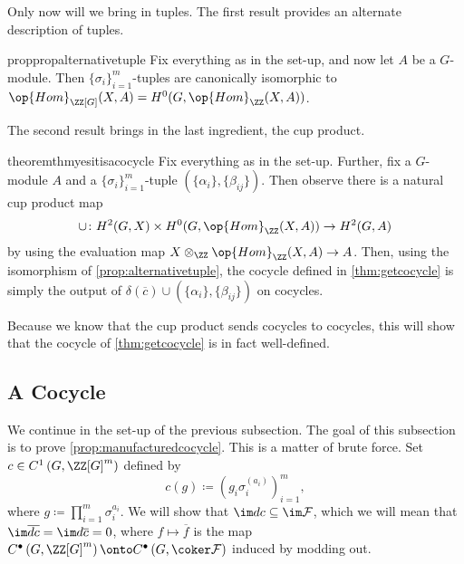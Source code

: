 \documentclass{article}
\numberwithin{equation}{section}
\begin{document}
Only now will we bring in tuples. The first result provides an alternate description of tuples.
\begin{restatable}{prop}{propalternativetuple} \label{prop:alternativetuple}
	Fix everything as in the set-up, and now let $A$ be a $G$-module. Then $\{\sigma_i\}_{i=1}^m$-tuples are canonically isomorphic to $\op{Hom}_{\ZZ[G]}(X,A)=H^0(G,\op{Hom}_\ZZ(X,A))$.
\end{restatable}
\noindent The second result brings in the last ingredient, the cup product.
\begin{restatable}{theorem}{thmyesitisacocycle} \label{thm:yesitisacocycle}
	Fix everything as in the set-up. Further, fix a $G$-module $A$ and a $\{\sigma_i\}_{i=1}^m$-tuple $\left(\{\alpha_i\},\{\beta_{ij}\}\right)$. Then observe there is a natural cup product map
	\[\cup\colon H^2(G,X)\times H^0(G,\op{Hom}_\ZZ(X,A))\to H^2(G,A)\]
	by using the evaluation map $X\otimes_\ZZ\op{Hom}_\ZZ(X,A)\to A$. Then, using the isomorphism of \autoref{prop:alternativetuple}, the cocycle defined in \autoref{thm:getcocycle} is simply the output of $\delta(\overline c)\cup\left(\{\alpha_i\},\{\beta_{ij}\}\right)$ on cocycles.
\end{restatable}
\noindent Because we know that the cup product sends cocycles to cocycles, this will show that the cocycle of \autoref{thm:getcocycle} is in fact well-defined.


\subsection{A Cocycle}
We continue in the set-up of the previous subsection. The goal of this subsection is to prove \autoref{prop:manufacturedcocycle}. This is a matter of brute force. Set $c\in C^1\left(G,\ZZ[G]^m\right)$ defined by
\[c(g)\coloneqq\left(g_i\sigma_i^{(a_i)}\right)^m_{i=1},\]
where $g\coloneqq\prod_{i=1}^m\sigma_i^{a_i}$. We will show that $\im dc\subseteq\im\mathcal F$, which we will mean that $\im\overline{dc}=\im d\overline c=0$, where $f\mapsto\overline f$ is the map $C^\bullet\left(G,\ZZ[G]^m\right)\onto C^\bullet\left(G,\coker\mathcal F\right)$ induced by modding out.
\end{document}
